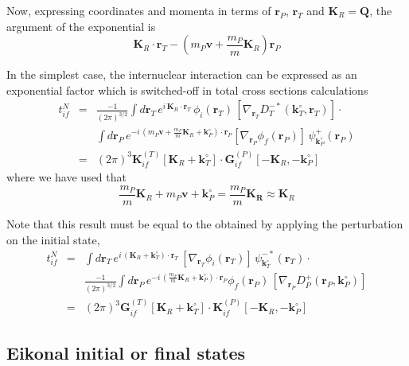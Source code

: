 Now, expressing coordinates and momenta in terms of $\bm{r}_{P}$,
$\bm{r}_{T}$ and $\bm{K}_{R}=\bm{Q}$, the argument of the exponential
is
\[
\bm{K}_{R} \cdot \bm{r}_{T} - \left( m_{P} \bm{v} + \frac{m_{P}}{m}
\bm{K}_{R} \right)\bm{r}_{P}
\]


In the simplest case, the internuclear interaction can be expressed as
an exponential factor which is switched-off in total cross sections
calculations
\begin{eqnarray}\label{Q:tif-cpt-noNN-f}
t_{if}^{N} &=& \frac{-1}{(2 \pi)^{3/2}}  \int d \bm{r}_{T} \,
e^{i \, \bm{K}_{R} \cdot \bm{r}_T} \, \phi_{i}(\bm{r}_T) \,\left[
\nabla_{\bm{r}_{T}} D^{-*}_{T}(\bm{k}^{\circ}_{T},\bm{r}_T) \right]  \cdot
\nonumber \\
&& \int d \bm{r}_{P} \, e^{- i \, (m_{P} \bm{v} +
\frac{m_{P}}{m} \bm{K}_{R} + \bm{k}_{P}^{\circ}) \cdot \bm{r}_{P}}
\left[\nabla_{\bm{r}_{P}} \phi_{f}(\bm{r}_{P}) \right] \,
\psi^{+}_{\bm{k}_{P}^{\circ}} (\bm{r}_{P}) \nonumber
\\
&=& (2 \pi)^{3} \bm{K}^{(T)}_{if}\left[ \bm{K}_{R} + \bm{k}_{T}^{\circ}
\right] \cdot \bm{G}^{(P)}_{if}\left[-\bm{K}_{R},-\bm{k}^{\circ}_{P}\right]
\end{eqnarray}
where we have used that
\[
\frac{m_{P}}{m} \bm{K}_{R} + m_{P}\bm{v} + \bm{k}_{P}^{\circ} =
\frac{m_{P}}{m} \bm{K_{R}} \approx \bm{K}_{R}
\]

Note that this result must be equal to the obtained by applying the
perturbation on the initial state,
%
\begin{eqnarray}\label{Q:tif-cpt-noNN-i}
t_{if}^{N} &=&  \int d \bm{r}_{T} \, e^{i \,(
\bm{K}_{R}+\bm{k}_{T}^{\circ}) \cdot \bm{r}_T} \,\left[ \nabla_{\bm{r}_{T}}
\phi_{i}(\bm{r}_T) \right] \, \psi^{-*}_{\bm{k}^{\circ}_{T}}(\bm{r}_T)   \cdot
\nonumber \\
&&\frac{-1}{(2 \pi)^{3/2}} \int d \bm{r}_{P} \, e^{- i \,
\left( \frac{m_{P}}{m} \bm{K}_{R} + \bm{k}_{P}^{\circ} \right) \cdot
\bm{r}_{P}} \phi_{f}(\bm{r}_{P}) \, \left[\nabla_{\bm{r}_{P}}
D^{+}_{P}(\bm{r}_{P},\bm{k}_{P}^{\circ}) \right]  \nonumber
\\
&=& (2 \pi)^{3} \bm{G}^{(T)}_{if}\left[ \bm{K}_{R} + \bm{k}_{T}^{\circ}
\right] \cdot \bm{K}^{(P)}_{if}\left[-\bm{K}_{R},-\bm{k}^{\circ}_{P}\right]
\end{eqnarray}

\subsection{Eikonal initial or final states}

